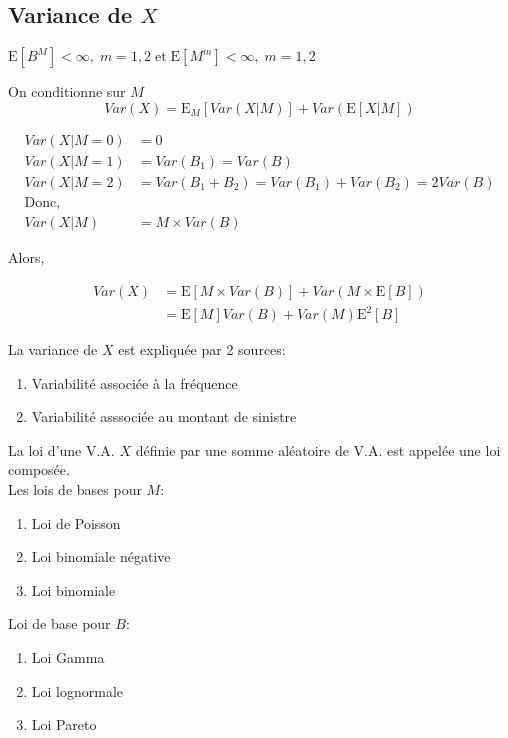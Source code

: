 \subsection{Variance de \(X\)}\label{variance-de-x}

\(\text{E}[B^M]<\infty,\; m=1,2\; \text{et}\; \text{E}[M^m]<\infty,\;m=1,2\)

On conditionne sur \(M\)\\
\[
Var(X)=\text{E}_M\left[Var(X|M)\right]+Var\left (\text{E}[X|M]\right )
\]

\begin{align*}
Var(X|M=0)& =0\\
Var(X|M=1)& =Var(B_1)=Var(B)\\
Var(X|M=2)& =Var(B_1+B_2)=Var(B_1)+Var(B_2)=2Var(B)\\
\text{Donc,}\\
Var(X|M)& =M\times Var(B)
\end{align*}

Alors,

\begin{align*}
Var(X)& =\text{E}\left [M\times Var(B)\right ]+ Var\left (M\times \text{E}[B]\right )\\
& =\text{E}[M]Var(B)+Var(M)\text{E}^2[B]
\end{align*}

La variance de \(X\) est expliquée par 2 sources:

\begin{enumerate}
\item Variabilité associée à la fréquence 
\item Variabilité asssociée au montant de sinistre
\end{enumerate}

La loi d'une V.A. \(X\) définie par une somme aléatoire de V.A. est
appelée une loi composée.\\
Les lois de bases pour \(M\):

\begin{enumerate}
\item Loi de Poisson
\item Loi binomiale négative 
\item Loi binomiale
\end{enumerate}

Loi de base pour \(B\):

\begin{enumerate}
\item Loi Gamma
\item Loi lognormale
\item Loi Pareto
\end{enumerate}

